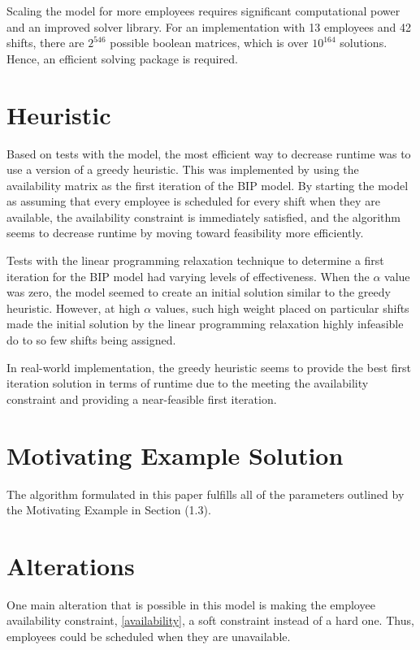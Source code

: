 Scaling the model for more employees requires significant computational power and an improved solver library. For an implementation with 13 employees and 42 shifts, there are $2^{546}$ possible boolean matrices, which is over $10^{164}$ solutions. Hence, an efficient solving package is required.

\section{Heuristic}

Based on tests with the model, the most efficient way to decrease runtime was to use a version of a greedy heuristic. This was implemented by using the availability matrix as the first iteration of the BIP model. By starting the model as assuming that every employee is scheduled for every shift when they are available, the availability constraint is immediately satisfied, and the algorithm seems to decrease runtime by moving toward feasibility more efficiently. 

Tests with the linear programming relaxation technique to determine a first iteration for the BIP model had varying levels of effectiveness. When the $\alpha$ value was zero, the model seemed to create an initial solution similar to the greedy heuristic. However, at high $\alpha$ values, such high weight placed on particular shifts made the initial solution by the linear programming relaxation highly infeasible do to so few shifts being assigned. 

In real-world implementation, the greedy heuristic seems to provide the best first iteration solution in terms of runtime due to the meeting the availability constraint and providing a near-feasible first iteration. 

\section{Motivating Example Solution}

The algorithm formulated in this paper fulfills all of the parameters outlined by the Motivating Example in Section (1.3).  

\section{Alterations}

One main alteration that is possible in this model is making the employee availability constraint, \eqref{availability}, a soft constraint instead of a hard one. Thus, employees could be scheduled when they are unavailable. 

